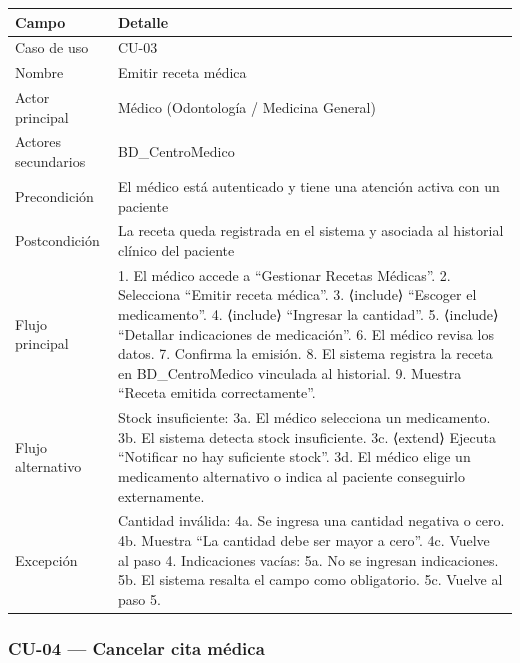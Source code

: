 \documentclass[11pt,a4paper]{article}
\begin{document}
	\begin{longtable}{p{} p{} }
		
		\toprule
		\textbf{Campo} &
		\textbf{Detalle}  \\
		\midrule
		\endhead
		
		
		Caso de uso & CU-03 \\
		Nombre & Emitir receta médica \\
		Actor principal & Médico (Odontología / Medicina General) \\
		Actores secundarios & BD\_CentroMedico \\
		Precondición & El médico está autenticado y tiene una atención activa con un paciente \\
		Postcondición & La receta queda registrada en el sistema y asociada al historial clínico del paciente \\
		Flujo principal & 1. El médico accede a ``Gestionar Recetas Médicas''. 2. Selecciona ``Emitir receta médica''. 3. ⟨include⟩ ``Escoger el medicamento''. 4. ⟨include⟩ ``Ingresar la cantidad''. 5. ⟨include⟩ ``Detallar indicaciones de medicación''. 6. El médico revisa los datos. 7. Confirma la emisión. 8. El sistema registra la receta en BD\_CentroMedico vinculada al historial. 9. Muestra ``Receta emitida correctamente''. \\
		Flujo alternativo & Stock insuficiente: 3a. El médico selecciona un medicamento. 3b. El sistema detecta stock insuficiente. 3c. ⟨extend⟩ Ejecuta ``Notificar no hay suficiente stock''. 3d. El médico elige un medicamento alternativo o indica al paciente conseguirlo externamente. \\
		Excepción & Cantidad inválida: 4a. Se ingresa una cantidad negativa o cero. 4b. Muestra ``La cantidad debe ser mayor a cero''. 4c. Vuelve al paso 4. Indicaciones vacías: 5a. No se ingresan indicaciones. 5b. El sistema resalta el campo como obligatorio. 5c. Vuelve al paso 5. \\
		
		\bottomrule
	\end{longtable}
	
	
	\subsubsection{CU-04 --- Cancelar cita médica}
	
\end{document}
